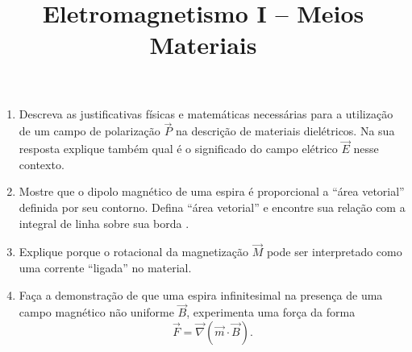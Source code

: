 \newif\ifuseseminar
\useseminartrue


\title{Eletromagnetismo I -- Meios Materiais}	



\begin{enumerate}
	\item  Descreva as justificativas físicas e matemáticas necessárias para a
	      utilização de um campo de polarização $\vec{P}$ na descrição de materiais
	      dielétricos. Na sua resposta explique também qual é o significado do campo elétrico
	      $\vec{E}$ nesse contexto.
	\item Mostre que o dipolo magnético de uma espira é proporcional  a ``área
	      vetorial'' definida por seu contorno. Defina ``área vetorial'' e encontre sua
	      relação com a integral de linha sobre sua borda .
	\item Explique porque o rotacional da magnetização $\vec{M}$ pode ser interpretado
	      como uma corrente ``ligada'' no material.
	\item Faça a demonstração de que uma espira infinitesimal na presença de uma campo
	      magnético não uniforme $\vec{B}$, experimenta uma força da forma
	      \begin{equation}
		      \vec{F} = \vec\nabla\left(\vec{m}\cdot\vec{B}\right).
	      \end{equation}
\end{enumerate}

